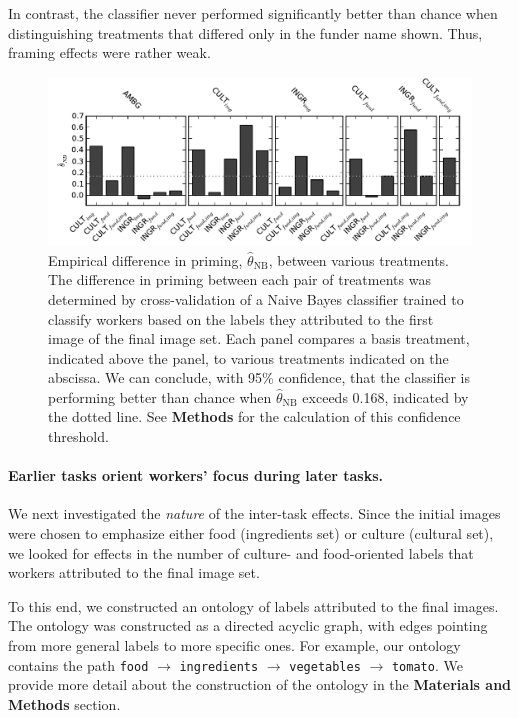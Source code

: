 \documentclass[a4paper]{report}
\begin{document}
In contrast, the classifier never performed significantly better than chance
when distinguishing treatments that differed only in the funder name shown. 
Thus, framing effects were rather weak.

\begin{figure}
	\includegraphics[scale=0.94]{figs/f1-thetas_full_pairwise25_img1.pdf}
	\caption{ \footnotesize{
		Empirical difference in priming, $\hat{\theta}_\text{NB}$, between 
		various treatments.  The difference in priming between each pair of 
		treatments 
		was determined by cross-validation of a Naive Bayes classifier trained
		to classify workers based on the labels they attributed to the first
		image of the final image set. Each panel compares a basis treatment,
		indicated above the panel, to various treatments indicated on the
		abscissa.  We can conclude, with 95\% confidence, that the classifier
		is performing better than chance when $\hat{\theta}_\text{NB}$ 
		exceeds 0.168, indicated by the dotted line.  See \textbf{Methods} for
		the calculation of this confidence threshold.
	}}
\end{figure}

\paragraph{Earlier tasks orient workers' focus during later tasks.} 
We next investigated the \textit{nature} of the inter-task effects.  Since the
initial images were chosen to emphasize either food (ingredients set) or 
culture (cultural set), we looked for effects in the number of culture- and 
food-oriented labels that workers attributed to the final image set.

To this end, we constructed an ontology of labels attributed to the final 
images.  The ontology was constructed as a directed acyclic graph, with edges 
pointing from more general labels to more specific ones.
For example, our ontology contains the path \texttt{food} $\to$ 
\texttt{ingredients} $\to$ \texttt{vegetables} $\to$ \texttt{tomato}. We 
provide more detail about the construction of the ontology in the 
\textbf{Materials and Methods} section.
\end{document}
